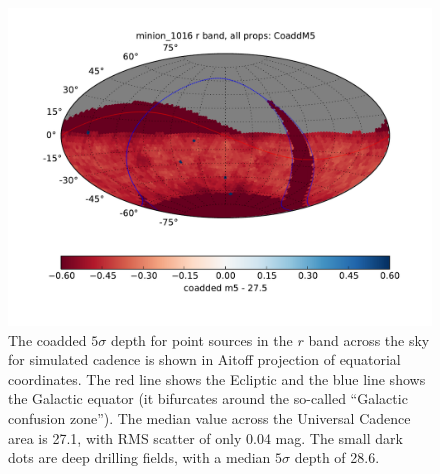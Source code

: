 \begin{figure}[t!]
\vskip -0.1in
\includegraphics[angle=0,width=0.99\hsize,clip]{figs/cadence/minion_1016_CoaddM5_r_band_all_props_OPSI_SkyMap.pdf}
\vskip -0.5in
\caption{The coadded $5\sigma$ depth for point sources in the $r$ band
across the sky for simulated cadence  is shown
in Aitoff projection of equatorial coordinates. The red line shows the Ecliptic and
the blue line shows the Galactic equator (it bifurcates around the so-called
``Galactic confusion zone''). The median value across the Universal Cadence area
is 27.1, with RMS scatter of only 0.04 mag. The small dark dots are deep drilling
fields, with a median $5\sigma$ depth of 28.6.}
\label{fig:coaddm5enigma}
\end{figure}

